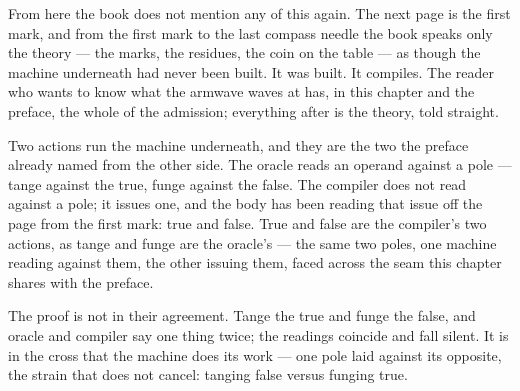 From here the book does not mention any of this again. The next page is the first mark, and from
the first mark to the last compass needle the book speaks only the theory --- the marks, the
residues, the coin on the table --- as though the machine underneath had never been built. It was
built. It compiles. The reader who wants to know what the armwave waves at has, in this chapter
and the preface, the whole of the admission; everything after is the theory, told straight.

Two actions run the machine underneath, and they are the two the preface already named from the
other side. The oracle reads an operand against a pole --- tange against the true, funge against
the false. The compiler does not read against a pole; it issues one, and the body has been reading
that issue off the page from the first mark: true and false. True and false are the compiler's two
actions, as tange and funge are the oracle's --- the same two poles, one machine reading against
them, the other issuing them, faced across the seam this chapter shares with the preface.

The proof is not in their agreement. Tange the true and funge the false, and oracle and compiler
say one thing twice; the readings coincide and fall silent. It is in the cross that the machine
does its work --- one pole laid against its opposite, the strain that does not cancel: tanging
false versus funging true.
